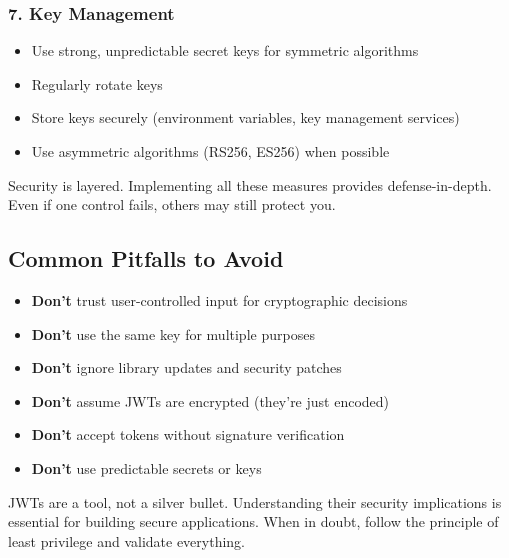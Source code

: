 \documentclass{article}
\begin{document}
\subsubsection{7. Key Management}
\begin{itemize}
    \item Use strong, unpredictable secret keys for symmetric algorithms
    \item Regularly rotate keys
    \item Store keys securely (environment variables, key management services)
    \item Use asymmetric algorithms (RS256, ES256) when possible
\end{itemize}

\begin{attackbox}[Remember]
Security is layered. Implementing all these measures provides defense-in-depth. Even if one control fails, others may still protect you.
\end{attackbox}

\subsection{Common Pitfalls to Avoid}

\begin{itemize}
    \item \textbf{Don't} trust user-controlled input for cryptographic decisions
    \item \textbf{Don't} use the same key for multiple purposes
    \item \textbf{Don't} ignore library updates and security patches
    \item \textbf{Don't} assume JWTs are encrypted (they're just encoded)
    \item \textbf{Don't} accept tokens without signature verification
    \item \textbf{Don't} use predictable secrets or keys
\end{itemize}

\begin{notebox}
JWTs are a tool, not a silver bullet. Understanding their security implications is essential for building secure applications. When in doubt, follow the principle of least privilege and validate everything.
\end{notebox}
\end{document}

